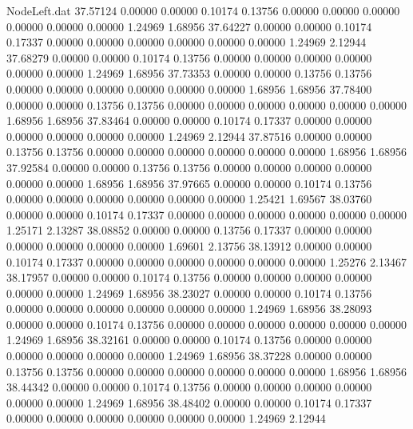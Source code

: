 \begin{filecontents}{NodeLeft.dat}
  37.57124    0.00000    0.00000     0.10174    0.13756    0.00000    0.00000    0.00000    0.00000    0.00000    0.00000    1.24969    1.68956
  37.64227    0.00000    0.00000     0.10174    0.17337    0.00000    0.00000    0.00000    0.00000    0.00000    0.00000    1.24969    2.12944
  37.68279    0.00000    0.00000     0.10174    0.13756    0.00000    0.00000    0.00000    0.00000    0.00000    0.00000    1.24969    1.68956
  37.73353    0.00000    0.00000     0.13756    0.13756    0.00000    0.00000    0.00000    0.00000    0.00000    0.00000    1.68956    1.68956
  37.78400    0.00000    0.00000     0.13756    0.13756    0.00000    0.00000    0.00000    0.00000    0.00000    0.00000    1.68956    1.68956
  37.83464    0.00000    0.00000     0.10174    0.17337    0.00000    0.00000    0.00000    0.00000    0.00000    0.00000    1.24969    2.12944
  37.87516    0.00000    0.00000     0.13756    0.13756    0.00000    0.00000    0.00000    0.00000    0.00000    0.00000    1.68956    1.68956
  37.92584    0.00000    0.00000     0.13756    0.13756    0.00000    0.00000    0.00000    0.00000    0.00000    0.00000    1.68956    1.68956
  37.97665    0.00000    0.00000     0.10174    0.13756    0.00000    0.00000    0.00000    0.00000    0.00000    0.00000    1.25421    1.69567
  38.03760    0.00000    0.00000     0.10174    0.17337    0.00000    0.00000    0.00000    0.00000    0.00000    0.00000    1.25171    2.13287
  38.08852    0.00000    0.00000     0.13756    0.17337    0.00000    0.00000    0.00000    0.00000    0.00000    0.00000    1.69601    2.13756
  38.13912    0.00000    0.00000     0.10174    0.17337    0.00000    0.00000    0.00000    0.00000    0.00000    0.00000    1.25276    2.13467
  38.17957    0.00000    0.00000     0.10174    0.13756    0.00000    0.00000    0.00000    0.00000    0.00000    0.00000    1.24969    1.68956
  38.23027    0.00000    0.00000     0.10174    0.13756    0.00000    0.00000    0.00000    0.00000    0.00000    0.00000    1.24969    1.68956
  38.28093    0.00000    0.00000     0.10174    0.13756    0.00000    0.00000    0.00000    0.00000    0.00000    0.00000    1.24969    1.68956
  38.32161    0.00000    0.00000     0.10174    0.13756    0.00000    0.00000    0.00000    0.00000    0.00000    0.00000    1.24969    1.68956
  38.37228    0.00000    0.00000     0.13756    0.13756    0.00000    0.00000    0.00000    0.00000    0.00000    0.00000    1.68956    1.68956
  38.44342    0.00000    0.00000     0.10174    0.13756    0.00000    0.00000    0.00000    0.00000    0.00000    0.00000    1.24969    1.68956
  38.48402    0.00000    0.00000     0.10174    0.17337    0.00000    0.00000    0.00000    0.00000    0.00000    0.00000    1.24969    2.12944

\end{filecontents}
